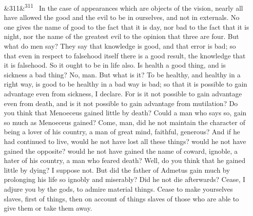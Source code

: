 \documentclass[12pt]{article}
\newcommand{\para}[1][]{\par\noindent\ifx&#1&\else\textsuperscript{\footnotesize #1}~\fi}
\begin{document}
\para[311] In the case of appearances which are objects of the vision, nearly all have allowed the good and the evil to be in ourselves, and not in externals. No one gives the name of good to the fact that it is day, nor bad to the fact that it is night, nor the name of the greatest evil to the opinion that three are four. But what do men say? They say that knowledge is good, and that error is bad; so that even in respect to falsehood itself there is a good result, the knowledge that it is falsehood. So it ought to be in life also. Is health a good thing, and is sickness a bad thing? No, man. But what is it? To be healthy, and healthy in a right way, is good to be healthy in a bad way is bad; so that it is possible to gain advantage even from sickness, I declare. For is it not possible to gain advantage even from death, and is it not possible to gain advantage from mutilation? Do you think that Menoeceus gained little by death? Could a man who says so, gain so much as Menoeceus gained? Come, man, did he not maintain the character of being a lover of his country, a man of great mind, faithful, generous? And if he had continued to live, would he not have lost all these things? would he not have gained the opposite? would he not have gained the name of coward, ignoble, a hater of his country, a man who feared death? Well, do you think that he gained little by dying? I suppose not. But did the father of Admetus gain much by prolonging his life so ignobly and miserably? Did he not die afterwards? Cease, I adjure you by the gods, to admire material things. Cease to make yourselves slaves, first of things, then on account of things slaves of those who are able to give them or take them away.
\end{document}
